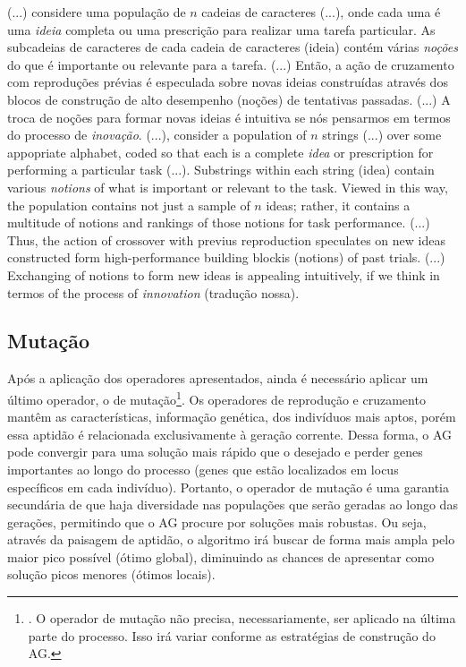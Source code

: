 \citacao
	{%
		(...) considere uma população de $n$ cadeias de caracteres (...), onde cada uma é uma \textit{ideia} completa ou uma prescrição para realizar uma tarefa particular. As subcadeias de caracteres de cada cadeia de caracteres (ideia) contém várias \textit{noções} do que é importante ou relevante para a tarefa. (...) Então, a ação de cruzamento com reproduções prévias é especulada sobre novas ideias construídas através dos blocos de construção de alto desempenho (noções) de tentativas passadas. (...) A troca de noções para formar novas ideias é intuitiva se nós pensarmos em termos do processo de \textit{inovação}.
	}{%
	(...), consider a population of $n$ strings (...) over some appopriate alphabet, coded so that each is a complete \textit{idea} or prescription for performing a particular task (...). Substrings within each string (idea) contain various \textit{notions} of what is important or relevant to the task. Viewed in this way, the population contains not just a sample of $n$ ideas; rather, it contains a multitude of notions and rankings of those notions for task performance. (...) Thus, the action of crossover with previus reproduction speculates on new ideas constructed form high-performance building blockis (notions) of past trials. (...) Exchanging of notions to form new ideas is appealing intuitively, if we think in termos of the process of \textit{innovation}
	}
	{\citep[pg.13]{goldberg_genetic_1989}}
	{(tradução nossa).}

\subsection{Mutação}
\label{subsec:mutacao}

Após a aplicação dos operadores apresentados, ainda é necessário aplicar um último operador, o de mutação\footnote{\label{rodape:aplicacao_operador_mutacao}. O operador de mutação não precisa, necessariamente, ser aplicado na última parte do processo. Isso irá variar conforme as estratégias de construção do AG.}. Os operadores de reprodução e cruzamento mantêm as características, informação genética, dos indivíduos mais aptos, porém essa aptidão é relacionada exclusivamente à geração corrente. Dessa forma, o AG pode convergir para uma solução mais rápido que o desejado e perder genes importantes ao longo do processo (genes que estão localizados em locus específicos em cada indivíduo). Portanto, o operador de mutação é uma garantia secundária de que haja diversidade nas populações que serão geradas ao longo das gerações, permitindo que o AG procure por soluções mais robustas. Ou seja, através da paisagem de aptidão, o algoritmo irá buscar de forma mais ampla pelo maior pico possível (ótimo global), diminuindo as chances de apresentar como solução picos menores (ótimos locais).

